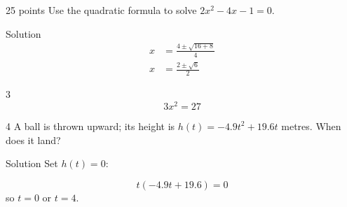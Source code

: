 \documentclass[11pt]{article}
\begin{document}
\begin{clproblem}{2}{5 points}
Use the quadratic formula to solve \(2x^{2} - 4x - 1 = 0\).

\begin{clsolution}{Solution}
\begin{align*}
x &= \frac{4 \pm \sqrt{16 + 8}}{4} \\
x &= \frac{2 \pm \sqrt{6}}{2}
\end{align*}
\end{clsolution}
\end{clproblem}

\begin{clproblem}{3}{}
\[
3x^{2} = 27
\]
\end{clproblem}

\begin{clproblem}{4}{}
A ball is thrown upward; its height is \(h(t) = -4.9t^{2} + 19.6t\) metres. When does it land?

\begin{clsolution}{Solution}
Set \(h(t) = 0\):

\[
t(-4.9t + 19.6) = 0
\]
so \(t = 0\) or \(t = 4\).

\end{clsolution}
\end{clproblem}
\end{document}
